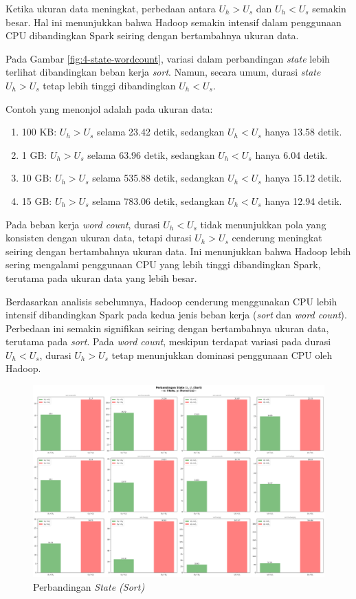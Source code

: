 Ketika ukuran data meningkat, perbedaan antara $U_h > U_s$ dan $U_h < U_s$ semakin besar. Hal ini menunjukkan bahwa Hadoop semakin intensif dalam penggunaan CPU dibandingkan Spark seiring dengan bertambahnya ukuran data.

Pada Gambar \ref{fig:4-state-wordcount}, variasi dalam perbandingan \textit{state} lebih terlihat dibandingkan beban kerja \textit{sort}. Namun, secara umum, durasi \textit{state} $U_h > U_s$ tetap lebih tinggi dibandingkan $U_h < U_s$.

Contoh yang menonjol adalah pada ukuran data:
\begin{enumerate}
	\item 100 KB: $U_h > U_s$ selama 23.42 detik, sedangkan $U_h < U_s$ hanya 13.58 detik.
	\item 1 GB: $U_h > U_s$ selama 63.96 detik, sedangkan $U_h < U_s$ hanya 6.04 detik.
	\item 10 GB: $U_h > U_s$ selama 535.88 detik, sedangkan $U_h < U_s$ hanya 15.12 detik.
	\item 15 GB: $U_h > U_s$ selama 783.06 detik, sedangkan $U_h < U_s$ hanya 12.94 detik.
\end{enumerate}

Pada beban kerja \textit{word count}, durasi $U_h < U_s$ tidak menunjukkan pola yang konsisten dengan ukuran data, tetapi durasi $U_h > U_s$ cenderung meningkat seiring dengan bertambahnya ukuran data. Ini menunjukkan bahwa Hadoop lebih sering mengalami penggunaan CPU yang lebih tinggi dibandingkan Spark, terutama pada ukuran data yang lebih besar.

Berdasarkan analisis sebelumnya, Hadoop cenderung menggunakan CPU lebih intensif dibandingkan Spark pada kedua jenis beban kerja (\textit{sort} dan \textit{word count}). Perbedaan ini semakin signifikan seiring dengan bertambahnya ukuran data, terutama pada \textit{sort}. Pada \textit{word count}, meskipun terdapat variasi pada durasi $U_h < U_s$, durasi $U_h > U_s$ tetap menunjukkan dominasi penggunaan CPU oleh Hadoop. 

\begin{landscape}
\begin{figure}[h]
    \centering
    \includegraphics[height=0.6\linewidth]{figures/ch04/4-state-sort.png}
    \caption{Perbandingan \textit{State (Sort)}}
    \label{fig:4-state-sort}
\end{figure}
\end{landscape}

